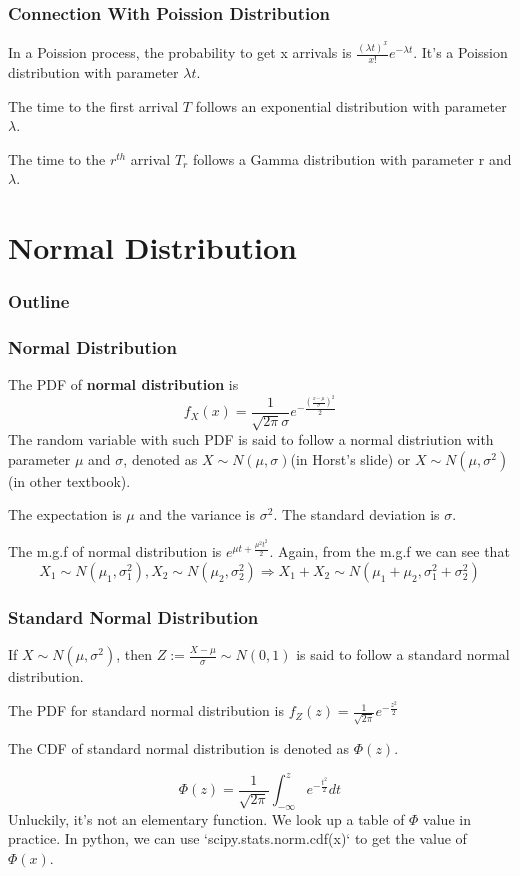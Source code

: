 \documentclass{beamer}
\begin{document}
\begin{frame}
    \frametitle{Connection With Poission Distribution}
    In a Poission process, the probability to get x arrivals is $\frac{(\lambda t)^x}{x!}e^{-\lambda t}$. It's a Poission distribution with parameter $\lambda t$.\par
    The time to the first arrival $T$ follows an exponential distribution with parameter $\lambda$.\par
    The time to the $r^{th}$ arrival $T_r$ follows a Gamma distribution with parameter r and $\lambda$.

\end{frame}



\section{Normal Distribution}

\begin{frame}
    \frametitle{Outline}
    \tableofcontents[currentsection]
\end{frame}

\begin{frame}
    \frametitle{Normal Distribution}
    The PDF of \textbf{normal distribution} is
    \[f_X(x)=\frac{1}{\sqrt{2\pi}\sigma} e^{-\frac{(\frac{x-\mu}{\sigma})^2}{2}} \]
The random variable with such PDF is said to follow a normal distriution with parameter $\mu$ and $\sigma$, denoted as $X\sim N(\mu, \sigma)$(in Horst's slide) or $X\sim N(\mu, \sigma^2)$(in other textbook).\par
The expectation is $\mu$ and the variance is $\sigma^2$. The standard deviation is $\sigma$.\par
The m.g.f of normal distribution is $e^{\mu t+\frac{\mu^2 t^2}{2}}$. Again, from the m.g.f we can see that
\[X_1\sim N(\mu_1,\sigma_1^2), X_2\sim N(\mu_2, \sigma_2^2)\Rightarrow X_1+X_2\sim N(\mu_1+\mu_2, \sigma_1^2+\sigma_2^2)\]

\end{frame}

\begin{frame}
    \frametitle{Standard Normal Distribution}
    If $X\sim N(\mu, \sigma^2)$, then $Z:=\frac{X-\mu}{\sigma}\sim N(0,1)$ is said to follow a standard normal distribution.\par
    The PDF for standard normal distribution is $f_{Z}(z)=\frac{1}{\sqrt{2\pi}}e^{-\frac{z^2}{2}}$

    The CDF of standard normal distribution is denoted as $\Phi(z)$.\par
    \[\Phi(z)=\frac{1}{\sqrt{2\pi}}\int_{-\infty}^{z}e^{-\frac{t^2}{2}}dt\]
    Unluckily, it's not an elementary function. We look up a table of $\Phi$ value in practice.
    In python, we can use `scipy.stats.norm.cdf(x)` to get the value of $\Phi(x)$.
    
\end{frame}
\end{document}
